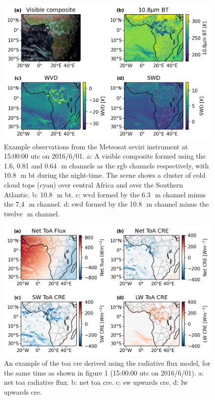 \begin{figure}[t]
    \includegraphics[width=\textwidth]{figures/ch3_01.png}
    \caption[
    Example observations from the Meteosat \acrshort{seviri} instrument at 15:00:00 \acrshort{utc} on 2016/6/01
    ]{
    Example observations from the Meteosat \acrshort{seviri} instrument at 15:00:00 \acrshort{utc} on 2016/6/01. a: A visible composite formed using the 1.6, 0.81 and 0.64\,\unit{\mu m} channels as the \acrshort{rgb} channels respectively, with 10.8\,\unit{\mu m} \acrshort{bt} during the night-time. The scene shows a cluster of cold cloud tops (cyan) over central Africa and over the Southern Atlantic. b: 10.8\,\unit{\mu m} \acrshort{bt}. c: \acrshort{wvd} formed by the 6.3\,\unit{\mu m} channel minus the 7.4\,\unit{\mu m} channel. d: \acrshort{swd} formed by the 10.8\,\unit{\mu m} channel minus the twelve\,\unit{\mu m} channel.
    }
    \label{fig:seviri_obs_example}
\end{figure}


\begin{figure}[t]
    \includegraphics[width=\textwidth]{figures/ch3_02.png}
    \caption[
    An example of the \acrshort{toa} \acrshort{cre} derived using the radiative flux model
    ]{
    An example of the \acrshort{toa} \acrshort{cre} derived using the radiative flux model, for the same time
    as shown in figure 1 (15:00:00 \acrshort{utc} on 2016/6/01). a: net \acrshort{toa} radiative flux. b: net \acrshort{toa} \acrshort{cre}. c: \acrshort{sw} upwards \acrshort{cre}. d: \acrshort{lw} upwards \acrshort{cre}.
    }
    \label{fig:seviri_flux_example}
\end{figure}


